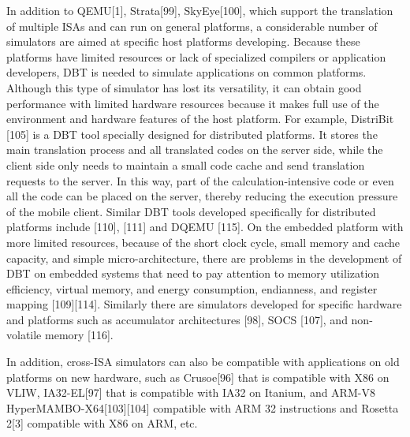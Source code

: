 In addition to QEMU[1], Strata[99], SkyEye[100], which support the translation of multiple ISAs and can run on general platforms, a considerable number of simulators are aimed at specific host platforms developing.
Because these platforms have limited resources or lack of specialized compilers or application developers, DBT is needed to simulate applications on common platforms. Although this type of simulator has lost its versatility, it can obtain good performance with limited hardware resources because it makes full use of the environment and hardware features of the host platform.
For example, DistriBit [105] is a DBT tool specially designed for distributed platforms.
It stores the main translation process and all translated codes on the server side, while the client side only needs to maintain a small code cache and send translation requests to the server.
In this way, part of the calculation-intensive code or even all the code can be placed on the server, thereby reducing the execution pressure of the mobile client.
Similar DBT tools developed specifically for distributed platforms include [110], [111] and DQEMU [115].
On the embedded platform with more limited resources, because of the short clock cycle, small memory and cache capacity, and simple micro-architecture, there are problems in the development of DBT on embedded systems that need to pay attention to memory utilization efficiency, virtual memory, and energy consumption, endianness, and register mapping [109][114].
Similarly there are simulators developed for specific hardware and platforms such as accumulator architectures [98], SOCS [107], and non-volatile memory [116].

In addition, cross-ISA simulators can also be compatible with applications on old platforms on new hardware, such as Crusoe[96] that is compatible with X86 on VLIW, IA32-EL[97] that is compatible with IA32 on Itanium, and ARM-V8 HyperMAMBO-X64[103][104] compatible with ARM 32 instructions and Rosetta 2[3] compatible with X86 on ARM, etc.

